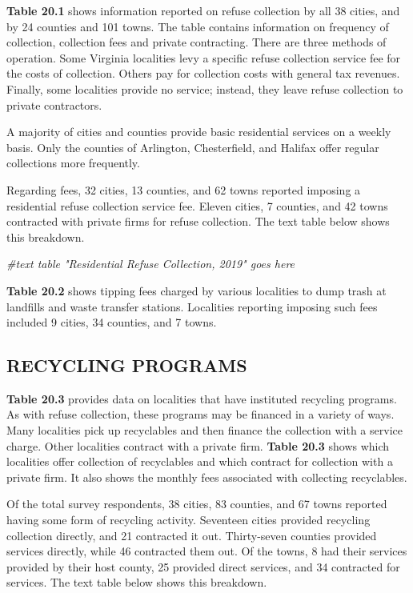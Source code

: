 \documentclass[
]{book}
\newenvironment{Shaded}{\begin{snugshade}}{\end{snugshade}}
\newcommand{\CommentTok}[1]{\textcolor[rgb]{0.56,0.35,0.01}{\textit{#1}}}
\begin{document}
\textbf{Table 20.1} shows information reported on refuse collection by all 38 cities, and by 24 counties and 101 towns. The table contains information on frequency of collection, collection fees and private contracting. There are three methods of operation. Some Virginia localities levy a specific refuse collection service fee for the costs of collection. Others pay for collection costs with general tax revenues. Finally, some localities provide no service; instead, they leave refuse collection to private contractors.

A majority of cities and counties provide basic residential services on a weekly basis. Only the counties of Arlington, Chesterfield, and Halifax offer regular collections more frequently.

Regarding fees, 32 cities, 13 counties, and 62 towns reported imposing a residential refuse collection service fee. Eleven cities, 7 counties, and 42 towns contracted with private firms for refuse collection. The text table below shows this breakdown.

\begin{Shaded}
\begin{Highlighting}[]
\CommentTok{\#text table "Residential Refuse Collection, 2019" goes here}
\end{Highlighting}
\end{Shaded}

\textbf{Table 20.2} shows tipping fees charged by various localities to dump trash at landfills and waste transfer stations. Localities reporting imposing such fees included 9 cities, 34 counties, and 7 towns.

\hypertarget{recycling-programs}{%
\subsection{RECYCLING PROGRAMS}\label{recycling-programs}}

\textbf{Table 20.3} provides data on localities that have instituted recycling programs. As with refuse collection, these programs may be financed in a variety of ways. Many localities pick up recyclables and then finance the collection with a service charge. Other localities contract with a private firm. \textbf{Table 20.3} shows which localities offer collection of recyclables and which contract for collection with a private firm. It also shows the monthly fees associated with collecting recyclables.

Of the total survey respondents, 38 cities, 83 counties, and 67 towns reported having some form of recycling activity. Seventeen cities provided recycling collection directly, and 21 contracted it out. Thirty-seven counties provided services directly, while 46 contracted them out. Of the towns, 8 had their services provided by their host county, 25 provided direct services, and 34 contracted for services. The text table below shows this breakdown.
\end{document}
